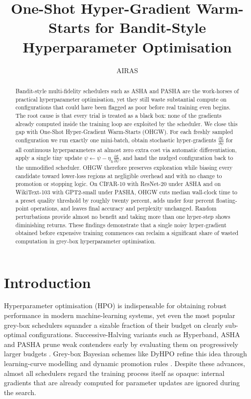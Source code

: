 \documentclass{article}
\title{One-Shot Hyper-Gradient Warm-Starts for Bandit-Style Hyperparameter Optimisation}
\author{AIRAS}
\begin{document}
\maketitle

\begin{abstract}
Bandit-style multi-fidelity schedulers such as ASHA and PASHA are the work-horses of practical hyperparameter optimisation, yet they still waste substantial compute on configurations that could have been flagged as poor before real training even begins. The root cause is that every trial is treated as a black box: none of the gradients already computed inside the training loop are exploited by the scheduler. We close this gap with One-Shot Hyper-Gradient Warm-Starts (OHGW). For each freshly sampled configuration we run exactly one mini-batch, obtain stochastic hyper-gradients \(\frac{\partial L}{\partial \psi}\) for all continuous hyperparameters at almost zero extra cost via automatic differentiation, apply a single tiny update \(\psi \leftarrow \psi - \eta_h \tfrac{\partial L}{\partial \psi}\), and hand the nudged configuration back to the unmodified scheduler. OHGW therefore preserves exploration while biasing every candidate toward lower-loss regions at negligible overhead and with no change to promotion or stopping logic. On CIFAR-10 with ResNet-20 under ASHA and on WikiText-103 with GPT2-small under PASHA, OHGW cuts median wall-clock time to a preset quality threshold by roughly twenty percent, adds under four percent floating-point operations, and leaves final accuracy and perplexity unchanged. Random perturbations provide almost no benefit and taking more than one hyper-step shows diminishing returns. These findings demonstrate that a single noisy hyper-gradient obtained before expensive training commences can reclaim a significant share of wasted computation in grey-box hyperparameter optimisation.
\end{abstract}

\section{Introduction}
Hyperparameter optimisation (HPO) is indispensable for obtaining robust performance in modern machine-learning systems, yet even the most popular grey-box schedulers squander a sizable fraction of their budget on clearly sub-optimal configurations. Successive-Halving variants such as Hyperband, ASHA and PASHA prune weak contenders early by evaluating them on progressively larger budgets \cite{bohdal-2022-pasha}. Grey-box Bayesian schemes like DyHPO refine this idea through learning-curve modelling and dynamic promotion rules \cite{wistuba-2022-supervising}. Despite these advances, almost all schedulers regard the training process itself as opaque: internal gradients that are already computed for parameter updates are ignored during the search.
\end{document}
